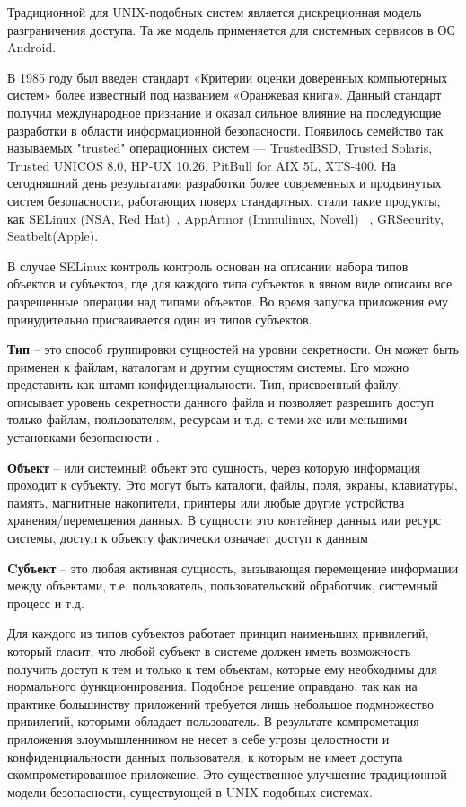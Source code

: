 Традиционной для UNIX-подобных систем является дискреционная модель
разграничения доступа. Та же модель применяется для системных сервисов в ОС
Android.

В 1985 году был введен стандарт «Критерии 
оценки доверенных компьютерных систем» более известный 
под названием «Оранжевая книга». Данный стандарт получил 
международное признание и оказал сильное влияние на 
последующие разработки в области информационной безопасности. 
Появилось семейство так называемых "trusted" операционных 
систем — TrustedBSD, Trusted Solaris, Trusted UNICOS 8.0, 
HP-UX 10.26, PitBull for AIX 5L, XTS-400. На сегодняшний 
день результатами разработки 
более современных и продвинутых систем безопасности, 
работающих поверх стандартных, стали такие продукты, как 
SELinux (NSA, Red Hat)~\cite{SEOF}, AppArmor (Immulinux, Novell) 
~\cite{AppArmor},
GRSecurity\cite{pax}, Seatbelt(Apple).

В случае SELinux контроль контроль основан на
описании набора типов объектов и субъектов, где для
каждого типа субъектов в явном виде описаны все разрешенные
операции над типами объектов. Во время запуска приложения
ему принудительно присваивается один из типов субъектов.

\textbf{Тип} -- это способ группировки сущностей на уровни
        секретности. Он может быть применен к файлам,
        каталогам и другим сущностям системы. Его можно
        представить как штамп конфиденциальности.
        Тип, присвоенный файлу, описывает уровень
        секретности данного файла и позволяет разрешить
        доступ только файлам, пользователям, ресурсам и т.д.
        с теми же или меньшими установками безопасности \cite{selinux2}.

\textbf{Объект} -- или системный объект это сущность,
        через которую информация проходит к субъекту.
        Это могут быть каталоги, файлы, поля, экраны,
        клавиатуры, память, магнитные накопители,
        принтеры или любые другие устройства хранения/перемещения
        данных. В сущности это контейнер данных или ресурс
        системы, доступ к объекту фактически означает доступ к данным \cite{selinux2}.

\textbf{Cубъект} -- это любая активная сущность, вызывающая
        перемещение информации между объектами, т.е.
        пользователь, пользовательский обработчик,
        системный процесс и т.д. \cite{selinux2}

Для каждого из типов субъектов работает принцип наименьших
привилегий, который гласит, что любой субъект в системе
должен иметь возможность получить доступ к тем и только к
тем объектам, которые ему необходимы для нормального
функционирования. Подобное решение оправдано,
так как на практике большинству приложений требуется лишь
небольшое подмножество привилегий, которыми обладает
пользователь. В результате компрометация приложения
злоумышленником не несет в себе угрозы целостности
и конфиденциальности данных пользователя, к которым не
имеет доступа скомпрометированное приложение. Это
существенное улучшение традиционной
модели безопасности, существующей в UNIX-подобных системах.

